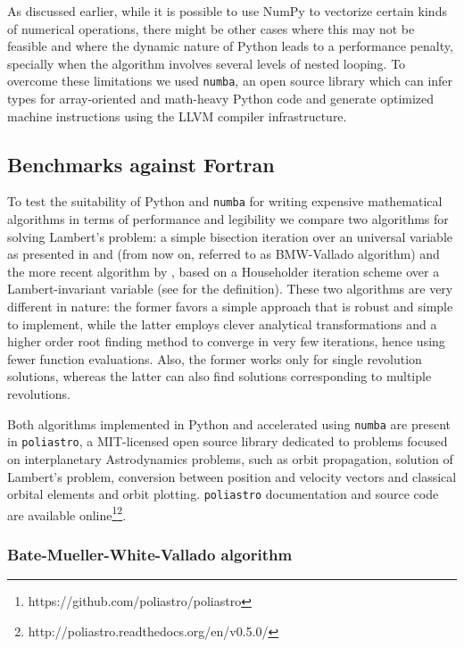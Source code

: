 As discussed earlier, while it is possible to use NumPy to vectorize certain kinds of numerical operations, there might be other cases where this may not be feasible and where the dynamic nature of Python leads to a performance penalty, specially when the algorithm involves several levels of nested looping. To overcome these limitations we used \verb|numba|, an open source library which can infer types for array-oriented and math-heavy Python code and generate optimized machine instructions using the LLVM compiler infrastructure\cite{numba}.

\subsection{Benchmarks against Fortran}

To test the suitability of Python and \verb|numba| for writing expensive mathematical algorithms in terms of performance and legibility we compare two algorithms for solving Lambert's problem: a simple bisection iteration over an universal variable as presented in \cite{bate1971fundamentals} and \cite{vallado2001fundamentals} (from now on, referred to as BMW-Vallado algorithm) and the more recent algorithm by \cite{Izzo2014}, based on a Householder iteration scheme over a Lambert-invariant variable (see \cite{gooding1990procedure} for the definition). These two algorithms are very different in nature: the former favors a simple approach that is robust and simple to implement, while the latter employs clever analytical transformations and a higher order root finding method to converge in very few iterations, hence using fewer function evaluations. Also, the former works only for single revolution solutions, whereas the latter can also find solutions corresponding to multiple revolutions.


Both algorithms implemented in Python and accelerated using \verb|numba| are present in \verb|poliastro|, a MIT-licensed open source library dedicated to problems focused on interplanetary Astrodynamics problems, such as orbit propagation, solution of Lambert's problem, conversion between position and velocity vectors and classical orbital elements and orbit plotting. \verb|poliastro| documentation and source code are available online\footnote{https://github.com/poliastro/poliastro}\footnote{http://poliastro.readthedocs.org/en/v0.5.0/}.

\subsubsection{Bate-Mueller-White-Vallado algorithm}

